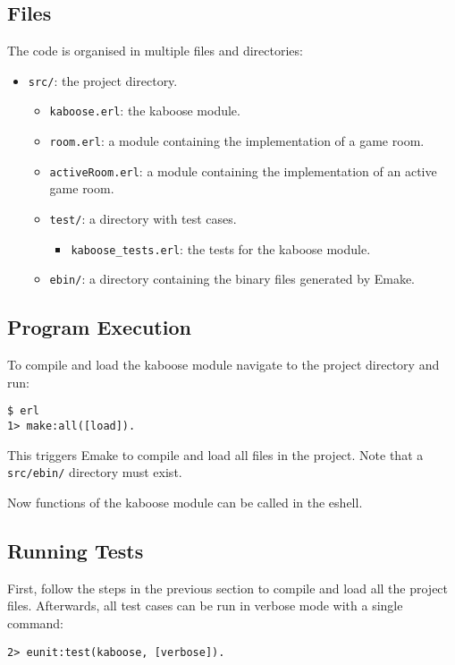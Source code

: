 \documentclass[11pt, a4paper]{article}
\begin{document}
\subsection{Files}
The code is organised in multiple files and directories:
\begin{itemize}
	\item \texttt{src/}: the project directory. 
	\begin{itemize}
		\item \texttt{kaboose.erl}: the kaboose module.
		\item \texttt{room.erl}: a module containing the implementation of a game room.
		\item \texttt{activeRoom.erl}: a module containing the implementation of an active game room.
		\item \texttt{test/}: a directory with test cases.
		\begin{itemize}
			\item \texttt{kaboose\_tests.erl}: the tests for the kaboose module.
		\end{itemize}
		\item \texttt{ebin/}: a directory containing the binary files generated by Emake.
	\end{itemize}
\end{itemize}

\subsection{Program Execution}
To compile and load the kaboose module navigate to the project directory and run:

\begin{verbatim}
$ erl
1> make:all([load]).
\end{verbatim}

This triggers Emake to compile and load all files in the project. Note that a \texttt{src/ebin/} directory must exist.

Now functions of the kaboose module can be called in the eshell.


\subsection{Running Tests}
First, follow the steps in the previous section to compile and load all the project files. Afterwards, all test cases can be run in verbose mode with a single command:

\begin{verbatim}
2> eunit:test(kaboose, [verbose]).
\end{verbatim}
\end{document}
